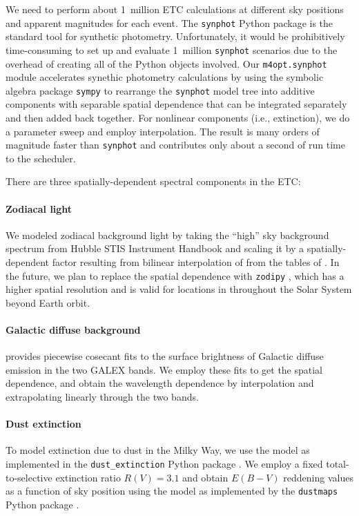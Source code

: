 \documentclass[twocolumn,times]{aastex631}
\begin{document}
We need to perform about 1~million \ac{ETC} calculations at different sky positions and apparent magnitudes for each event. The \texttt{synphot} Python package \citep{2018ascl.soft11001S} is the standard tool for synthetic photometry. Unfortunately, it would be prohibitively time-consuming to set up and evaluate 1~million \texttt{synphot} scenarios due to the overhead of creating all of the Python objects involved. Our \texttt{m4opt.synphot} module accelerates synethic photometry calculations by using the symbolic algebra package \texttt{sympy} \citep{10.7717/peerj-cs.103} to rearrange the \texttt{synphot} model tree into additive components with separable spatial dependence that can be integrated separately and then added back together. For nonlinear components (i.e., extinction), we do a parameter sweep and employ interpolation. The result is many orders of magnitude faster than \texttt{synphot} and contributes only about a second of run time to the scheduler.

There are three spatially-dependent spectral components in the \ac{ETC}:

\paragraph{Zodiacal light}
We modeled zodiacal background light by taking the ``high'' sky background spectrum from Hubble \ac{STIS} Instrument Handbook \citep{2024stis.rept....5R} and scaling it by a spatially-dependent factor resulting from bilinear interpolation of from the tables of \citet{1998A&AS..127....1L}. In the future, we plan to replace the spatial dependence with \texttt{zodipy} \citep{2022A&A...666A.107S,2024JOSS....9.6648S}, which has a higher spatial resolution and is valid for locations in throughout the Solar System beyond Earth orbit.

\paragraph{Galactic diffuse background}
\citet{2014ApJS..213...32M} provides piecewise cosecant fits to the surface brightness of Galactic diffuse emission in the two GALEX bands. We employ these fits to get the spatial dependence, and obtain the wavelength dependence by interpolation and extrapolating linearly through the two bands.

\paragraph{Dust extinction}
To model extinction due to dust in the Milky Way, we use the \citet{2023ApJ...950...86G} model as implemented in the \texttt{dust\_extinction} Python package \citep{2024JOSS....9.7023G}. We employ a fixed total-to-selective extinction ratio $R(V) = 3.1$ and obtain $E(B-V)$ reddening values as a function of sky position using the \citet{2016A&A...596A.109P} model as implemented by the \texttt{dustmaps} Python package \citep{2018JOSS....3..695M}.
\end{document}
